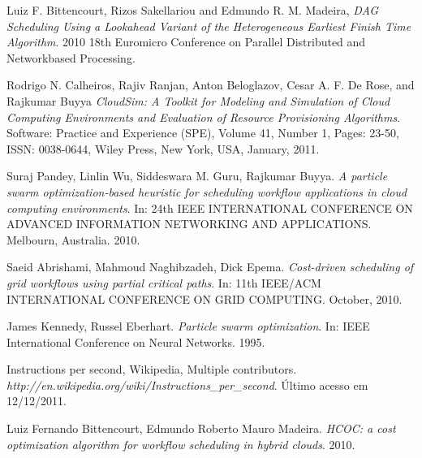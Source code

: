 \documentclass[a4paper,10pt]{article}
\begin{document}
\begin{thebibliography}{9}

  Luiz F. Bittencourt, Rizos Sakellariou and Edmundo R. M. Madeira,
  \emph{DAG Scheduling Using a Lookahead Variant
of the Heterogeneous Earliest Finish Time Algorithm}.
  2010 18th Euromicro Conference on Parallel Distributed and Networkbased Processing.

  Rodrigo N. Calheiros, Rajiv Ranjan, Anton Beloglazov, Cesar A. F. De Rose, and Rajkumar Buyya
  \emph{CloudSim: A Toolkit for Modeling and Simulation of Cloud Computing Environments and Evaluation of Resource Provisioning Algorithms}.
  Software: Practice and Experience (SPE),
  Volume 41, Number 1, Pages: 23-50, ISSN: 0038-0644,
  Wiley Press, New York, USA, January, 2011.

  Suraj Pandey, Linlin Wu, Siddeswara M. Guru, Rajkumar Buyya.
  \emph{A particle swarm    optimization-based heuristic for scheduling workflow applications in cloud computing environments}. 
  In: 24th IEEE INTERNATIONAL CONFERENCE ON ADVANCED INFORMATION NETWORKING AND APPLICATIONS. Melbourn, Australia. 2010.               

  Saeid Abrishami, Mahmoud Naghibzadeh, Dick Epema. 
  \emph{Cost-driven scheduling of grid workflows using partial critical paths}. 
  In: 11th IEEE/ACM INTERNATIONAL CONFERENCE ON GRID COMPUTING. October, 2010.
                                                    

   James Kennedy, Russel Eberhart. 
   \emph{Particle swarm optimization}. 
   In: IEEE International Conference on Neural Networks. 1995.

   Instructions per second, Wikipedia, Multiple contributors.
   \emph{http://en.wikipedia.org/wiki/Instructions\_per\_second}. 
   Último acesso em 12/12/2011.

   Luiz Fernando Bittencourt, Edmundo Roberto Mauro Madeira.
   \emph{HCOC: a cost optimization algorithm for workflow scheduling in hybrid clouds}. 2010.
 

\end{thebibliography}
\end{document}
